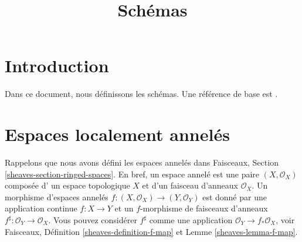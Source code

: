 

%


\title{Schémas}


\maketitle

\label{section-phantom}

\tableofcontents

\section{Introduction}
\label{section-introduction}

\noindent
Dans ce document, nous définissons les schémas. Une référence de base est
 \cite{EGA}.









\section{Espaces localement annelés}
\label{section-locally-ringed-spaces}

\noindent
Rappelons que nous avons défini les espaces annelés dans Faisceaux, Section
 \ref{sheaves-section-ringed-spaces}. En bref, un espace annelé est une paire  $(X, \mathcal{O}_X)$  composée d'
un espace topologique  $X$  et d'un faisceau d'anneaux  $\mathcal{O}_X$. Un
morphisme d'espaces annelés  $f : (X, \mathcal{O}_X) \to (Y, \mathcal{O}_Y)$  est donné par une application continue
 $f : X \to Y$  et un  $f$-morphisme de faisceaux d'anneaux  $f^\sharp : \mathcal{O}_Y \to \mathcal{O}_X$.
Vous pouvez considérer  $f^\sharp$  comme une application  $\mathcal{O}_Y \to f_*\mathcal{O}_X$, voir
Faisceaux, Définition  \ref{sheaves-definition-f-map}  et Lemme  \ref{sheaves-lemma-f-map}.

